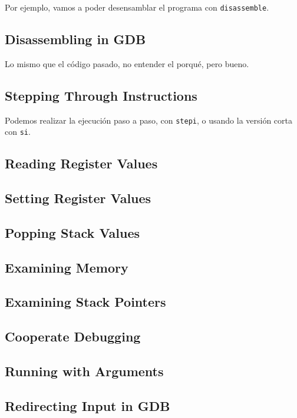 Por ejemplo, vamos a poder desensamblar el programa con \texttt{disassemble}.

\subsection{Disassembling in GDB}\label{subsec:disassembling_in_gdb}

Lo mismo que el código pasado, no entender el porqué, pero bueno.

\subsection{Stepping Through Instructions}\label{subsec:stepping_through_instructions}

Podemos realizar la ejecución paso a paso, con \texttt{stepi}, o usando la versión corta con \texttt{si}.

\subsection{Reading Register Values}\label{subsec:reading_register_values}

\subsection{Setting Register Values}\label{subsec:setting_register_values}

\subsection{Popping Stack Values}\label{subsec:popping_stack_values}

\subsection{Examining Memory}\label{subsec:examining_memory}

\subsection{Examining Stack Pointers}\label{subsec:examining_stack_pointers}

\subsection{Cooperate Debugging}\label{subsec:cooperate_debugging}

\subsection{Running with Arguments}\label{subsec:running_with_arguments}

\subsection{Redirecting Input in GDB}\label{subsec:redirecting_input_in_gdb}
